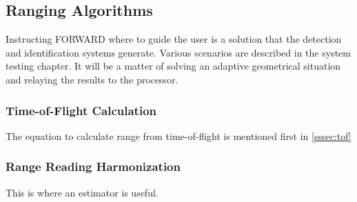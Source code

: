 \subsection{Ranging Algorithms}
\noindent Instructing FORWARD where to guide the user is a solution that the detection and identification systems generate. Various scenarios are described in the system testing chapter. It will be a matter of solving an adaptive geometrical situation and relaying the results to the processor.\\

\subsubsection{Time-of-Flight Calculation}
\noindent The equation to calculate range from time-of-flight is mentioned first in \ref{sssec:tof}\\

\subsubsection{Range Reading Harmonization}
\noindent This is where an estimator is useful.\\